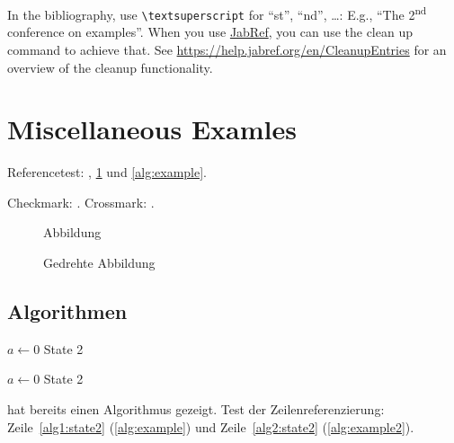 \documentclass[
  fontsize=10pt,
  numbers=noenddot,
  english,  %
  paper=a5,
  twoside,  %
  DIV=calc,
  headings=small,
  bibliography=totoc,
  listof=totoc,
  draft=false
]{scrbook}
\theoremstyle{break}
\newcommand{\dingcheck}{\ding{51}}
\newcommand{\dingcross}{\ding{55}}
\begin{document}
In the bibliography, use \texttt{\textbackslash textsuperscript} for \enquote{st}, \enquote{nd}, \ldots:
E.g., \enquote{The 2\textsuperscript{nd} conference on examples}.
When you use \href{https://www.jabref.org}{JabRef}, you can use the clean up command to achieve that.
See \url{https://help.jabref.org/en/CleanupEntries} for an overview of the cleanup functionality.

\section{Miscellaneous Examles}
\label{ssec:example}

Referencetest: , \cref{fig:Abbildung} und \cref{alg:example}.

\begin{ltgexample}
Checkmark: \dingcheck.
Crossmark: \dingcross.
\end{ltgexample}

\begin{figure}
  \missingfigure{}
  \caption{Abbildung}
  \label{fig:Abbildung}
\end{figure}

\begin{landscape}
  \begin{figure}
    \missingfigure{}
    \caption{Gedrehte Abbildung}
    \label{fig:AbbildungGedreht}
  \end{figure}
\end{landscape}

\subsection{Algorithmen}

\begin{algorithm}
  \caption{$algo$}
  \label{alg:example}
  \begin{algorithmic}[1]
    \State $a \gets 0$
    \State State 2\label{alg1:state2}
  \end{algorithmic}
\end{algorithm}

\begin{algorithm}
  \caption{Algorithmus 2}
  \label{alg:example2}
  \begin{algorithmic}[1]
    \State $a \gets 0$
    \State State 2\label{alg2:state2}
  \end{algorithmic}
\end{algorithm}

 hat bereits einen Algorithmus gezeigt.
Test der Zeilenreferenzierung: Zeile~\ref{alg1:state2} (\cref{alg:example}) und Zeile~\ref{alg2:state2} (\cref{alg:example2}).
\end{document}
